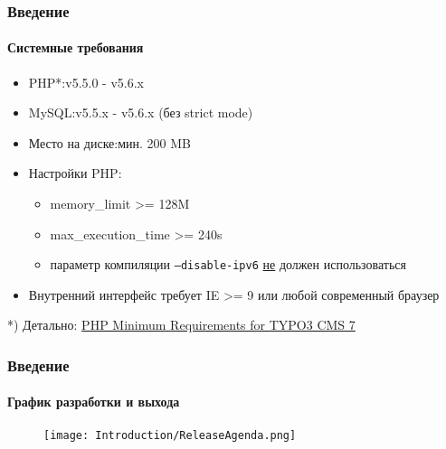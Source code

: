 
\begin{frame}[fragile]
	\frametitle{Введение}
	\framesubtitle{Системные требования}

	\begin{itemize}
		\item PHP*:\tabto{3.2cm}v5.5.0 - v5.6.x
		\item MySQL:\tabto{3.2cm}v5.5.x - v5.6.x (без strict mode)
		\item Место на диске:\tabto{3.2cm}мин. 200 MB
		\item Настройки PHP:

			\begin{itemize}
				\item memory\_limit >= 128M
				\item max\_execution\_time >= 240s
				\item параметр компиляции \texttt{--disable-ipv6} \underline{не} должен использоваться
			\end{itemize}

		\item Внутренний интерфейс требует IE >= 9 или любой современный браузер

	\end{itemize}

	\vspace{0.2cm}
	*) Детально: \href{http://typo3.org/news/article/php-minimum-requirements-for-typo3-cms-7/}{PHP Minimum Requirements for TYPO3 CMS 7}

\end{frame}


\begin{frame}[fragile]
	\frametitle{Введение}
	\framesubtitle{График разработки и выхода}

	\begin{figure}
		\texttt{[image: Introduction/ReleaseAgenda.png]}
	\end{figure}

\end{frame}

